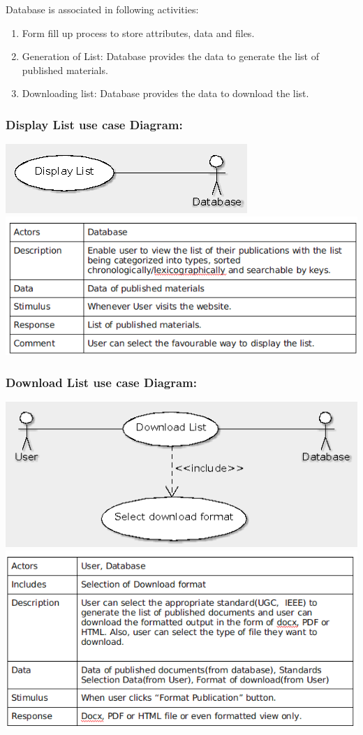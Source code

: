 \documentclass[12pt]{extarticle}
\begin{document}
		Database is associated in following activities:
		\begin{enumerate}
			\item Form fill up process to store attributes, data and files.
			\item Generation of List: Database provides the data to generate the list of published materials.
			\item Downloading list: Database provides the data to download the list.
			
		\end{enumerate}
		\subsubsection{Display List use case Diagram:}
		\includegraphics[scale=0.5]{Display_List_Use_Case}
		\\
		\includegraphics[scale=0.7]{uc/displaylistusecase}
		
		\subsubsection{Download List use case Diagram:}
		\includegraphics[scale=0.5]{Download_List_Use_Case}
		\\
		\includegraphics[scale=.7]{uc/downloadlistusecase}
	\newpage
\end{document}
